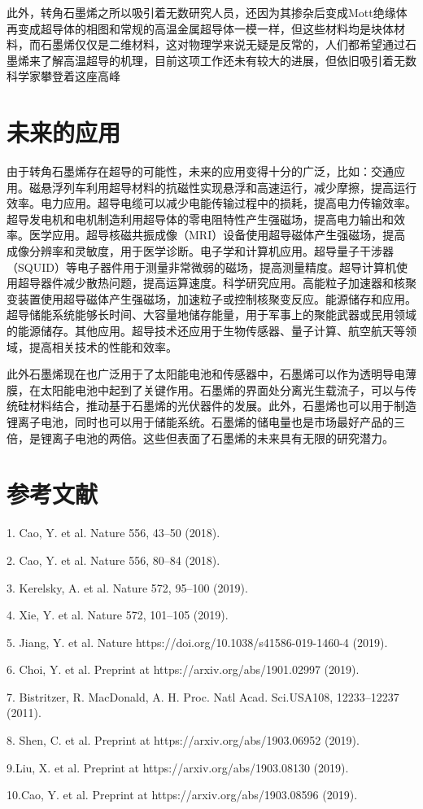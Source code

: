 \documentclass[hyperref,a4paper,UTF8]{ctexart}
\begin{document}
此外，转角石墨烯之所以吸引着无数研究人员，还因为其掺杂后变成Mott绝缘体再变成超导体的相图和常规的高温金属超导体一模一样，但这些材料均是块体材料，而石墨烯仅仅是二维材料，这对物理学来说无疑是反常的，人们都希望通过石墨烯来了解高温超导的机理，目前这项工作还未有较大的进展，但依旧吸引着无数科学家攀登着这座高峰

\section{未来的应用}
由于转角石墨烯存在超导的可能性，未来的应用变得十分的广泛，比如：交通应用。磁悬浮列车利用超导材料的抗磁性实现悬浮和高速运行，减少摩擦，提高运行效率。电力应用。超导电缆可以减少电能传输过程中的损耗，提高电力传输效率。超导发电机和电机制造利用超导体的零电阻特性产生强磁场，提高电力输出和效率。医学应用。超导核磁共振成像（MRI）设备使用超导磁体产生强磁场，提高成像分辨率和灵敏度，用于医学诊断。电子学和计算机应用。超导量子干涉器（SQUID）等电子器件用于测量非常微弱的磁场，提高测量精度。超导计算机使用超导器件减少散热问题，提高运算速度。科学研究应用。高能粒子加速器和核聚变装置使用超导磁体产生强磁场，加速粒子或控制核聚变反应。能源储存和应用。超导储能系统能够长时间、大容量地储存能量，用于军事上的聚能武器或民用领域的能源储存。其他应用。超导技术还应用于生物传感器、量子计算、航空航天等领域，提高相关技术的性能和效率。

此外石墨烯现在也广泛用于了太阳能电池和传感器中，石墨烯可以作为透明导电薄膜，在太阳能电池中起到了关键作用。石墨烯的界面处分离光生载流子，可以与传统硅材料结合，推动基于石墨烯的光伏器件的发展。此外，石墨烯也可以用于制造锂离子电池，同时也可以用于储能系统。石墨烯的储电量也是市场最好产品的三倍，是锂离子电池的两倍。这些但表面了石墨烯的未来具有无限的研究潜力。
\



\section*{参考文献}

1. Cao, Y. et al. Nature 556, 43–50 (2018).

2. Cao, Y. et al. Nature 556, 80–84 (2018).

3. Kerelsky, A. et al. Nature 572, 95–100 (2019).

4. Xie, Y. et al. Nature 572, 101–105 (2019).

5. Jiang, Y. et al. Nature https://doi.org/10.1038/s41586-019-1460-4 (2019).

6. Choi, Y. et al. Preprint at https://arxiv.org/abs/1901.02997 (2019).

7. Bistritzer, R. MacDonald, A. H. Proc. Natl Acad. Sci.USA108, 12233–12237 (2011).

8. Shen, C. et al. Preprint at https://arxiv.org/abs/1903.06952 (2019).

9.Liu, X. et al. Preprint at https://arxiv.org/abs/1903.08130 (2019).

10.Cao, Y. et al. Preprint at https://arxiv.org/abs/1903.08596 (2019).
\end{document}
